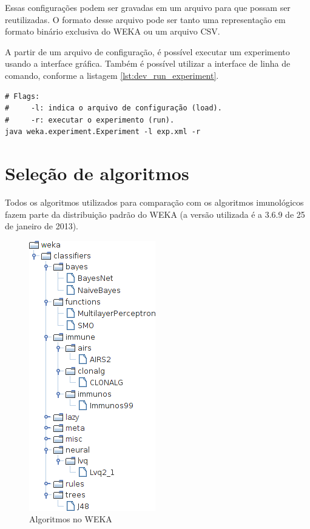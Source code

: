 Essas configurações podem ser gravadas em um arquivo para que possam ser reutilizadas. O formato desse arquivo pode ser tanto uma representação em formato binário exclusiva do WEKA ou um arquivo CSV.

A partir de um arquivo de configuração, é possível executar um experimento usando a interface gráfica. Também é possível utilizar a interface de linha de comando, conforme a listagem \ref{lst:dev_run_experiment}.

\vspace{0.5cm}
\begin{lstlisting}[caption=Execução de um experimento, label=lst:dev_run_experiment]
# Flags:
#     -l: indica o arquivo de configuração (load).
#     -r: executar o experimento (run).
java weka.experiment.Experiment -l exp.xml -r
\end{lstlisting}
\vspace{0.5cm}

\section{Seleção de algoritmos}

Todos os algoritmos utilizados para comparação com os algoritmos imunológicos fazem parte da distribuição padrão do WEKA (a versão utilizada é a 3.6.9 de 25 de janeiro de 2013).

\vspace{0.5cm}
\begin{figure}[h]
    \centering
    \caption{Algoritmos no WEKA}
    \label{fig:dev_weka_algos}
    \vspace{0.5cm}
    \includegraphics{img/weka_algos_cropped.png}
    \vspace{0.5cm}
\end{figure}
\vspace{0.5cm}

